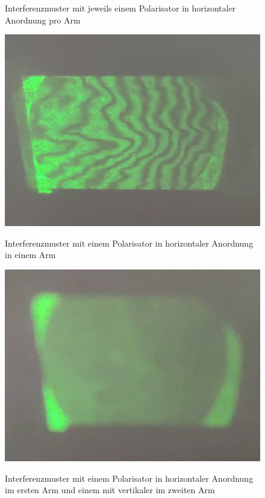 \documentclass[ngerman]{scrartcl}
\begin{document}
\begin{figure}[H]
\begin{minipage}[t]{0.45\linewidth}
        \caption[Interferenzmuster ein Polarisator horizontal pro Arm]{Interferenzmuster mit jeweils einem Polarisator in horizontaler Anordnung pro Arm}
        \label{fig:michelson_pol_2_horizontal}
    \end{minipage}%
    \hspace*{\fill}
    \begin{minipage}[t]{0.45\linewidth}
        \centering
        \includegraphics[width=\linewidth]{fig/Compressed/Arago_horizontal_detail.jpg}
        \caption[Interferenzmuster ein Polarisator horizontal ein Arm]{Interferenzmuster mit einem Polarisator in horizontaler Anordnung in einem Arm}
        \label{fig:michelson_pol_1_horizontal}
        \includegraphics[width=\linewidth]{fig/Compressed/Arago_mixed Detail.jpg}
        \caption[Interferenzmuster zwei Polarisatoren gekreuzt]{Interferenzmuster mit einem Polarisator in horizontaler Anordnung im ersten Arm und einem mit vertikaler im zweiten Arm}
        \label{fig:michelson_pol_mixed}
    \end{minipage}
\end{figure}
\end{document}
